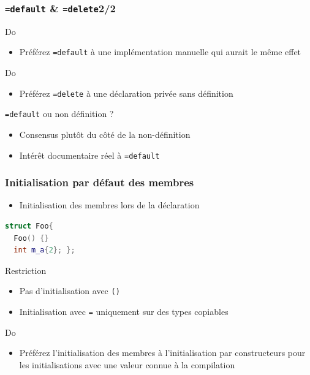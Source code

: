\documentclass[C++.tex]{subfiles}
\begin{document}
\begin{frame}[fragile]
	\frametitle{\lstinline|=default| \& \lstinline|=delete|\titlehfill{}2/2}
	\begin{exampleblock}{Do}
		\begin{itemize}
			\item Préférez \lstinline|=default| à une implémentation manuelle qui aurait le même effet
		\end{itemize}
	\end{exampleblock}

	\begin{exampleblock}{Do}
		\begin{itemize}
			\item Préférez \lstinline|=delete| à une déclaration privée sans définition
		\end{itemize}
	\end{exampleblock}

	\begin{block}{\lstinline|=default| ou non définition ?}
		\begin{itemize}
			\item Consensus plutôt du côté de la non-définition
			\item Intérêt documentaire réel à \lstinline|=default|
		\end{itemize}
	\end{block}
\end{frame}

\begin{frame}[fragile]
	\frametitle{Initialisation par défaut des membres}
	\begin{itemize}
		\item Initialisation des membres lors de la déclaration
	\end{itemize}

	\begin{lstlisting}[language=C++]
struct Foo{
  Foo() {}
  int m_a{2}; };\end{lstlisting}

	\begin{alertblock}{Restriction}
		\begin{itemize}
			\item Pas d'initialisation avec \lstinline|()|
			\item Initialisation avec \lstinline|=| uniquement sur des types copiables
		\end{itemize}
	\end{alertblock}

	\begin{exampleblock}{Do}
		\begin{itemize}
			\item Préférez l'initialisation des membres à l'initialisation par constructeurs pour les initialisations avec une valeur connue à la compilation
		\end{itemize}

	\end{exampleblock}
\end{frame}
\end{document}
